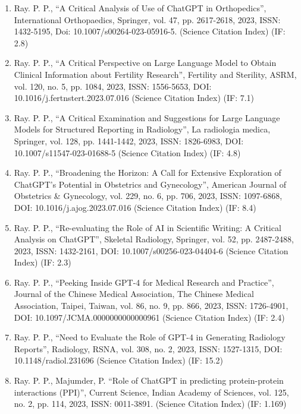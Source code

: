 \documentclass[11pt,a4paper]{moderncv}
\begin{document}
\begin{adjustwidth}{6em}{0pt}
\begin{enumerate}
		\item Ray. P. P., “A Critical Analysis of Use of ChatGPT in Orthopedics”, International Orthopaedics, Springer, vol. 47, pp. 2617-2618, 2023, ISSN: 1432-5195, Doi: 10.1007/s00264-023-05916-5. (Science Citation Index) (IF: 2.8)
		
		\item Ray. P. P., “A Critical Perspective on Large Language Model to Obtain Clinical Information about Fertility Research”, Fertility and Sterility, ASRM, vol. 120, no. 5, pp. 1084, 2023, ISSN: 1556-5653, DOI: 10.1016/j.fertnstert.2023.07.016 (Science Citation Index) (IF: 7.1)
		
		\item Ray. P. P., “A Critical Examination and Suggestions for Large Language Models for Structured Reporting in Radiology”, La radiologia medica, Springer, vol. 128, pp. 1441-1442, 2023, ISSN: 1826-6983, DOI: 10.1007/s11547-023-01688-5 (Science Citation Index) (IF: 4.8)
		
		\item Ray. P. P., “Broadening the Horizon: A Call for Extensive Exploration of ChatGPT's Potential in Obstetrics and Gynecology”, American Journal of Obstetrics \& Gynecology, vol. 229, no. 6, pp. 706, 2023, ISSN: 1097-6868, DOI: 10.1016/j.ajog.2023.07.016 (Science Citation Index) (IF: 8.4)
		
		\item Ray. P. P., “Re-evaluating the Role of AI in Scientific Writing: A Critical Analysis on ChatGPT”, Skeletal Radiology, Springer, vol. 52, pp. 2487-2488, 2023, ISSN: 1432-2161, DOI: 10.1007/s00256-023-04404-6 (Science Citation Index) (IF: 2.3)
		
		\item Ray. P. P., “Peeking Inside GPT-4 for Medical Research and Practice”, Journal of the Chinese Medical Association, The Chinese Medical Association, Taipei, Taiwan, vol. 86, no. 9, pp. 866, 2023, ISSN: 1726-4901, DOI: 10.1097/JCMA.0000000000000961 (Science Citation Index) (IF: 2.4)
		
		\item Ray. P. P., “Need to Evaluate the Role of GPT-4 in Generating Radiology Reports”, Radiology, RSNA, vol. 308, no. 2, 2023, ISSN: 1527-1315, DOI: 10.1148/radiol.231696 (Science Citation Index) (IF: 15.2)
		
		\item Ray. P. P., Majumder, P. “Role of ChatGPT in predicting protein-protein interactions (PPI)”, Current Science, Indian Academy of Sciences, vol. 125, no. 2, pp. 114, 2023, ISSN: 0011-3891. (Science Citation Index) (IF: 1.169)
				

\end{enumerate}
\end{adjustwidth}
\end{document}
